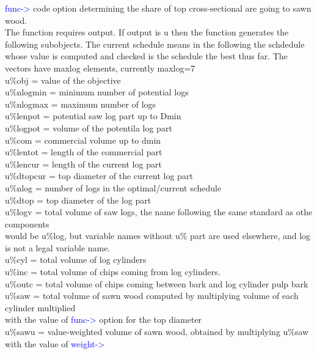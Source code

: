 \textcolor{blue}{func->} code option determining the share of top cross-sectional are going to sawn wood.\\ 
The function requires output. If output is u then the function generates the following subobjects. 
The current schedule means in the following the schdedule whose value is computed and checked 
is the schedule the best thus far. The vectors have maxlog elements, currently maxlog=7 \\ 
u\%obj = value of the objective\\ 
u\%nlogmin = minimum number of potential logs\\ 
u\%nlogmax = maximum number of logs\\ 
u\%lenpot = potential saw log part up to Dmin\\ 
u\%logpot = volume of the potentila log part\\ 
u\%com = commercial volume up to dmin\\ 
u\%lentot = length of the commercial part\\ 
u\%lencur = length of the current log part\\ 
u\%dtopcur = top diameter of the current log part\\ 
u\%nlog = number of logs in the optimal/current schedule\\ 
u\%dtop = top diameter of the log part\\ 
u\%logv = total volume of saw logs, the name following the same standard as othe components\\ 
would be u\%log, but variable names without u\% part are used elsewhere, and log is not a legal variable name.\\ 
u\%cyl = total volume of log cylinders\\ 
u\%inc = total volume of chips coming from log cylinders.\\ 
u\%outc = total volume of chips coming between bark and log cylinder pulp bark\\ 
 
u\%saw = total volume of sawn wood computed by multiplying volume of each cylinder multiplied\\ 
with the value of \textcolor{blue}{func->} option for the top diameter\\ 
 
u\%sawu = value-weighted volume of sawn wood, obtained by multiplying 
u\%saw with the value of \textcolor{blue}{weight->}\\ 
 
